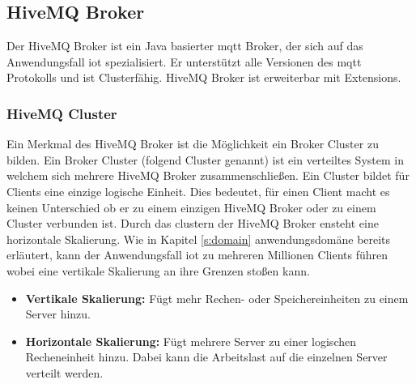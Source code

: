 \newpage

\subsection{HiveMQ Broker} \label{s:hivemq-broker}
Der HiveMQ Broker ist ein Java basierter \ac{mqtt} Broker, der sich auf das Anwendungsfall \acl{iot} spezialisiert.
Er unterstützt alle Versionen des \ac{mqtt} Protokolls und ist Clusterfähig.
HiveMQ Broker ist erweiterbar mit Extensions.

\subsubsection{HiveMQ Cluster} \label{s:hivemq-cluster}
Ein Merkmal des HiveMQ Broker ist die Möglichkeit ein Broker Cluster zu bilden.
Ein Broker Cluster (folgend Cluster genannt) ist ein verteiltes System in welchem sich mehrere HiveMQ Broker zusammenschlie{\ss}en.
Ein Cluster bildet für Clients eine einzige logische Einheit.
Dies bedeutet, für einen Client macht es keinen Unterschied ob er zu einem einzigen HiveMQ Broker oder zu einem Cluster verbunden ist.
\cite{HiveMQClusterHiveMQ}
Durch das clustern der HiveMQ Broker ensteht eine horizontale Skalierung. Wie in Kapitel \ref{s:domain} anwendungsdomäne bereits erläutert, kann der Anwendungsfall \ac{iot} zu mehreren Millionen Clients führen wobei eine vertikale Skalierung an ihre Grenzen sto{\ss}en kann.
\begin{itemize}
    \item \textbf{Vertikale Skalierung:} Fügt mehr Rechen- oder Speichereinheiten zu einem Server hinzu.
    \item \textbf{Horizontale Skalierung:} Fügt mehrere Server zu einer logischen Recheneinheit hinzu. Dabei kann die Arbeitslast auf die einzelnen Server verteilt werden.
\end{itemize}
\cite{HowScaleIT}

